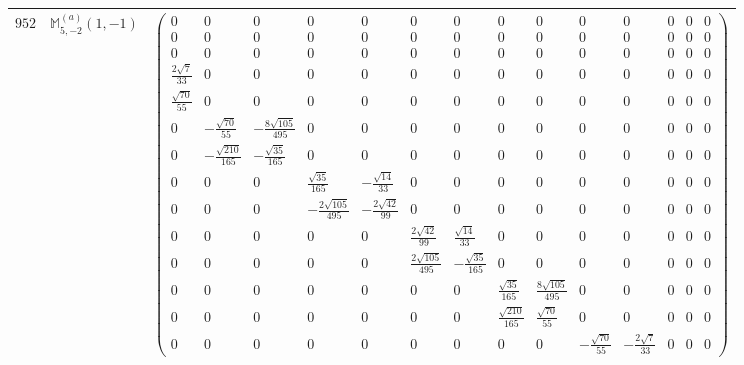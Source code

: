 \documentclass[fleqn,8pt,landscape]{jsarticle}
\begin{document}
\begin{center}
\begin{longtable}{ccc}
$ 952 $ & $ \mathbb{M}_{5,-2}^{(a)}(1,-1) $ & $ \begin{pmatrix} 0 & 0 & 0 & 0 & 0 & 0 & 0 & 0 & 0 & 0 & 0 & 0 & 0 & 0 \\ 0 & 0 & 0 & 0 & 0 & 0 & 0 & 0 & 0 & 0 & 0 & 0 & 0 & 0 \\ 0 & 0 & 0 & 0 & 0 & 0 & 0 & 0 & 0 & 0 & 0 & 0 & 0 & 0 \\ \frac{2 \sqrt{7}}{33} & 0 & 0 & 0 & 0 & 0 & 0 & 0 & 0 & 0 & 0 & 0 & 0 & 0 \\ \frac{\sqrt{70}}{55} & 0 & 0 & 0 & 0 & 0 & 0 & 0 & 0 & 0 & 0 & 0 & 0 & 0 \\ 0 & - \frac{\sqrt{70}}{55} & - \frac{8 \sqrt{105}}{495} & 0 & 0 & 0 & 0 & 0 & 0 & 0 & 0 & 0 & 0 & 0 \\ 0 & - \frac{\sqrt{210}}{165} & - \frac{\sqrt{35}}{165} & 0 & 0 & 0 & 0 & 0 & 0 & 0 & 0 & 0 & 0 & 0 \\ 0 & 0 & 0 & \frac{\sqrt{35}}{165} & - \frac{\sqrt{14}}{33} & 0 & 0 & 0 & 0 & 0 & 0 & 0 & 0 & 0 \\ 0 & 0 & 0 & - \frac{2 \sqrt{105}}{495} & - \frac{2 \sqrt{42}}{99} & 0 & 0 & 0 & 0 & 0 & 0 & 0 & 0 & 0 \\ 0 & 0 & 0 & 0 & 0 & \frac{2 \sqrt{42}}{99} & \frac{\sqrt{14}}{33} & 0 & 0 & 0 & 0 & 0 & 0 & 0 \\ 0 & 0 & 0 & 0 & 0 & \frac{2 \sqrt{105}}{495} & - \frac{\sqrt{35}}{165} & 0 & 0 & 0 & 0 & 0 & 0 & 0 \\ 0 & 0 & 0 & 0 & 0 & 0 & 0 & \frac{\sqrt{35}}{165} & \frac{8 \sqrt{105}}{495} & 0 & 0 & 0 & 0 & 0 \\ 0 & 0 & 0 & 0 & 0 & 0 & 0 & \frac{\sqrt{210}}{165} & \frac{\sqrt{70}}{55} & 0 & 0 & 0 & 0 & 0 \\ 0 & 0 & 0 & 0 & 0 & 0 & 0 & 0 & 0 & - \frac{\sqrt{70}}{55} & - \frac{2 \sqrt{7}}{33} & 0 & 0 & 0 \end{pmatrix} $ \\ \hline

\end{longtable}
\end{center}
\end{document}
